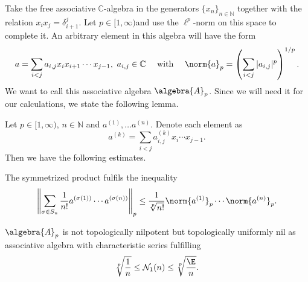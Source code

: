 \documentclass[
11pt,                          %
english                        %
]{article}
\begin{document}
Take the free associative $\mathbb{C}$-algebra in the generators $\{x_n\}_{n \in 
\mathbb{N}}$ together with the relation $x_i x_j = \delta_{i+1}^j$. Let $p \in [1, 
\infty)$and use the $\ell^p$-norm on this space to complete it. An arbitrary 
element in this algebra will have the form
\begin{equation*}
	a =
	\sum\limits_{i < j}
	a_{i, j} x_i x_{i + 1} \cdots x_{j - 1}
	, \
	a_{i,j} \in \mathbb{C}
	\quad \text{ with } \quad
	\norm{a}_p
	=
	\left(
		\sum\limits_{i < j}
		|a_{i, j}|^p
	\right)^{1/p}.
\end{equation*}
We want to call this associative algebra $\algebra{A}_p$. Since we will need it for 
our calculations, we state the following lemma.
\begin{lemma}
	Let $p \in [1, \infty)$, $n \in \mathbb{N}$ and $a^{(1)}, \ldots a^{(n)}$. 
	Denote each element as
	\begin{equation*}
		a^{(k)}
		=
		\sum\limits_{i < j} a_{i, j}^{(k)} x_i \cdots x_{j-1}.
	\end{equation*}
	Then we have the following estimates.
	\begin{lemmalist}
		\item
		The symmetrized product fulfils the inequality
		\begin{equation}
			\label{note1:lemma:Ex1ProductEstimateAssociative}
			\left\Vert
				\sum\limits_{\sigma \in S_n}
				\frac{1}{n!}
				a^{(\sigma(1))} \cdots a^{(\sigma(n))}
			\right\Vert_p
			\leq
			\frac{1}{\sqrt[p]{n!}}
			\norm{a^{(1)}}_p \cdots \norm{a^{(n)}}_p.
		\end{equation}
		
		\item
		$\algebra{A}_p$ is not topologically nilpotent but topologically uniformly 
		nil as associative algebra with characteristic series fulfilling
		\begin{equation}
			\label{note1:lemma:Ex1NilpotencyAssociative}
			\sqrt[p]{\frac{1}{n}} 
			\leq 
			\mathcal{N}_1(n) 
			\leq 
			\sqrt[p]{\frac{\E}{n}}.
		\end{equation}	
	\end{lemmalist}
\end{lemma}
\end{document}
